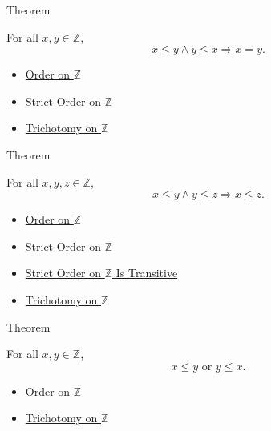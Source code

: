 \begin{theorembox}{Theorem}
\begin{theorem}
\label{thm:order-on-z-antisymmetric}
For all $x,y\in\mathbb{Z}$,
\[
x\le y\land y\le x \Longrightarrow x=y.
\]
\end{theorem}
\end{theorembox}

\begin{dependencies}
\begin{itemize}
  \item \hyperref[def:order-on-z]{Order on $\mathbb{Z}$}
  \item \hyperref[def:strict-order-on-z]{Strict Order on $\mathbb{Z}$}
  \item \hyperref[thm:trichotomy-on-z]{Trichotomy on $\mathbb{Z}$}
\end{itemize}
\end{dependencies}

\begin{theorembox}{Theorem}
\begin{theorem}
\label{thm:order-on-z-transitive}
For all $x,y,z\in\mathbb{Z}$,
\[
x\le y\land y\le z \Longrightarrow x\le z.
\]
\end{theorem}
\end{theorembox}

\begin{dependencies}
\begin{itemize}
  \item \hyperref[def:order-on-z]{Order on $\mathbb{Z}$}
  \item \hyperref[def:strict-order-on-z]{Strict Order on $\mathbb{Z}$}
  \item \hyperref[thm:strict-order-on-z-transitive]{Strict Order on $\mathbb{Z}$ Is Transitive}
  \item \hyperref[thm:trichotomy-on-z]{Trichotomy on $\mathbb{Z}$}
\end{itemize}
\end{dependencies}

\begin{theorembox}{Theorem}
\begin{theorem}
\label{thm:order-on-z-total}
For all $x,y\in\mathbb{Z}$,
\[
x\le y\text{ or }y\le x.
\]
\end{theorem}
\end{theorembox}

\begin{dependencies}
\begin{itemize}
  \item \hyperref[def:order-on-z]{Order on $\mathbb{Z}$}
  \item \hyperref[thm:trichotomy-on-z]{Trichotomy on $\mathbb{Z}$}
\end{itemize}
\end{dependencies}

